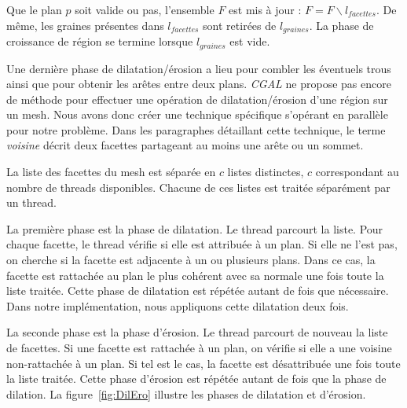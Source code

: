 ﻿\documentclass[12pt, twoside]{article}
\begin{document}
Que le plan $p$ soit valide ou pas, l'ensemble $F$ est mis à jour : $F = F\backslash l_{facettes}$. De même, les graines présentes dans $l_{facettes}$ sont retirées de $l_{graines}$. La phase de croissance de région se termine lorsque $l_{graines}$ est vide.

Une dernière phase de dilatation/érosion a lieu pour combler les éventuels trous ainsi que pour obtenir les arêtes entre deux plans. \textit{CGAL} ne propose pas encore de méthode pour effectuer une opération de dilatation/érosion d'une région sur un mesh. Nous avons donc créer une technique spécifique s'opérant en parallèle  pour notre problème. Dans les paragraphes détaillant cette technique, le terme \textit{voisine} décrit deux facettes partageant au moins une arête ou un sommet.

La liste des facettes du mesh est séparée en $c$ listes distinctes, $c$ correspondant au nombre de threads disponibles. Chacune de ces listes est traitée séparément par un thread.

La première phase est la phase de dilatation. Le thread parcourt la liste. Pour chaque facette, le thread vérifie si elle est attribuée à un plan. Si elle ne l'est pas, on cherche si la facette est adjacente à un ou plusieurs plans. Dans ce cas, la facette est rattachée au plan le plus cohérent avec sa normale une fois toute la liste traitée. Cette phase de dilatation est répétée autant de fois que nécessaire. Dans notre implémentation, nous appliquons cette dilatation deux fois.

La seconde phase est la phase d'érosion. Le thread parcourt de nouveau la liste de facettes. Si une facette est rattachée à un plan, on vérifie si elle a une voisine non-rattachée à un plan. Si tel est le cas, la facette est désattribuée une fois toute la liste traitée. Cette phase d'érosion est répétée autant de fois que la phase de dilation. La figure~\ref{fig:DilEro} illustre les phases de dilatation et d'érosion.
\end{document}
